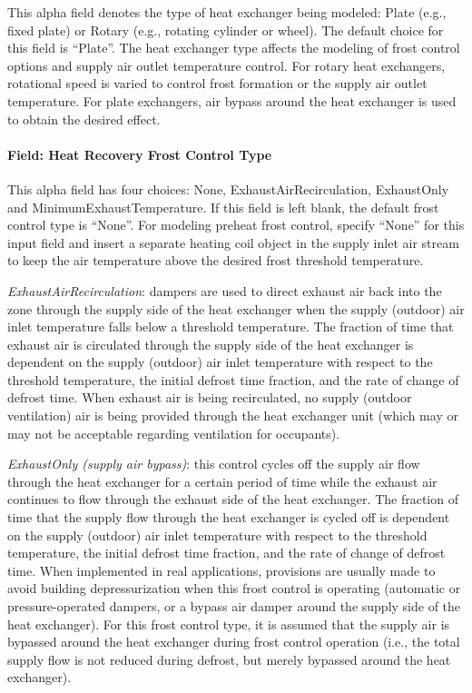 This alpha field denotes the type of heat exchanger being modeled: Plate (e.g., fixed plate) or Rotary (e.g., rotating cylinder or wheel). The default choice for this field is ``Plate''. The heat exchanger type affects the modeling of frost control options and supply air outlet temperature control. For rotary heat exchangers, rotational speed is varied to control frost formation or the supply air outlet temperature. For plate exchangers, air bypass around the heat exchanger is used to obtain the desired effect.

\paragraph{Field: Heat Recovery Frost Control Type}\label{field-heat-recovery-frost-control-type-1}

This alpha field has four choices: None, ExhaustAirRecirculation, ExhaustOnly and MinimumExhaustTemperature. If this field is left blank, the default frost control type is ``None''. For modeling preheat frost control, specify ``None'' for this input field and insert a separate heating coil object in the supply inlet air stream to keep the air temperature above the desired frost threshold temperature.

\emph{ExhaustAirRecirculation}: dampers are used to direct exhaust air back into the zone through the supply side of the heat exchanger when the supply (outdoor) air inlet temperature falls below a threshold temperature. The fraction of time that exhaust air is circulated through the supply side of the heat exchanger is dependent on the supply (outdoor) air inlet temperature with respect to the threshold temperature, the initial defrost time fraction, and the rate of change of defrost time. When exhaust air is being recirculated, no supply (outdoor ventilation) air is being provided through the heat exchanger unit (which may or may not be acceptable regarding ventilation for occupants).

\emph{ExhaustOnly (supply air bypass)}: this control cycles off the supply air flow through the heat exchanger for a certain period of time while the exhaust air continues to flow through the exhaust side of the heat exchanger. The fraction of time that the supply flow through the heat exchanger is cycled off is dependent on the supply (outdoor) air inlet temperature with respect to the threshold temperature, the initial defrost time fraction, and the rate of change of defrost time. When implemented in real applications, provisions are usually made to avoid building depressurization when this frost control is operating (automatic or pressure-operated dampers, or a bypass air damper around the supply side of the heat exchanger). For this frost control type, it is assumed that the supply air is bypassed around the heat exchanger during frost control operation (i.e., the total supply flow is not reduced during defrost, but merely bypassed around the heat exchanger).

